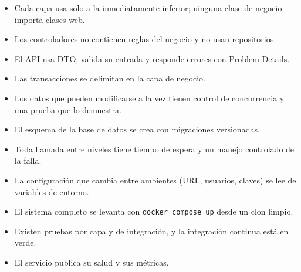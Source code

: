 \begin{okBox}[title={Antes de entregar, compruebe que su sistema cumple}]
	\begin{itemize}
		\item[$\square$] Cada capa usa solo a la inmediatamente inferior; ninguna clase de negocio importa clases web.
		\item[$\square$] Los controladores no contienen reglas del negocio y no usan repositorios.
		\item[$\square$] El API usa DTO, valida su entrada y responde errores con Problem Details.
		\item[$\square$] Las transacciones se delimitan en la capa de negocio.
		\item[$\square$] Los datos que pueden modificarse a la vez tienen control de concurrencia y una prueba que lo demuestra.
		\item[$\square$] El esquema de la base de datos se crea con migraciones versionadas.
		\item[$\square$] Toda llamada entre niveles tiene tiempo de espera y un manejo controlado de la falla.
		\item[$\square$] La configuración que cambia entre ambientes (URL, usuarios, claves) se lee de variables de entorno.
		\item[$\square$] El sistema completo se levanta con \texttt{docker compose up} desde un clon limpio.
		\item[$\square$] Existen pruebas por capa y de integración, y la integración continua está en verde.
		\item[$\square$] El servicio publica su salud y sus métricas.
	\end{itemize}
\end{okBox}
